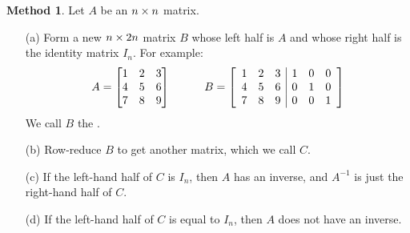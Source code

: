 \documentclass[a4paper]{book}
\theoremstyle{definition}
\newtheorem{method}[theorem]{Method}
\begin{document}
\begin{method}
 Let $A$ be an $n\times n$ matrix.
 \begin{itemize}
  \item[(a)] Form a new $n\times 2n$ matrix $B$ whose left half is $A$
   and whose right half is the identity matrix $I_n$.  For example:
   {\small \[ A = \begin{bmatrix} 1&2&3 \\ 4&5&6 \\ 7&8&9 \end{bmatrix}
              \hspace{3em}
              B = \left[\begin{array}{ccc|ccc}
                   1&2&3 & 1&0&0 \\
                   4&5&6 & 0&1&0 \\ 
                   7&8&9 & 0&0&1 
                  \end{array}\right]
   \]}
   We call $B$ the .
  \item[(b)] Row-reduce $B$ to get another matrix, which we call $C$.
  \item[(c)] If the left-hand half of $C$ is $I_n$, then $A$ has an
   inverse, and $A^{-1}$ is just the right-hand half of $C$.
  \item[(d)] If the left-hand half of $C$ is  equal to
   $I_n$, then $A$ does not have an inverse.
 \end{itemize}
\end{method}
\end{document}
